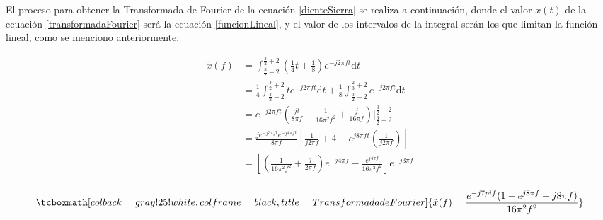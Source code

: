\documentclass[11pt,a4paper,twocolumn]{article}
\begin{document}
    El proceso para obtener la Transformada de Fourier de la ecuación \ref{dienteSierra} 
    se realiza a continuación, donde el valor $x(t)$ de la ecuación \ref{transformadaFourier} será la 
    ecuación \ref{funcionLineal}, y el valor de los intervalos de la integral serán los que 
    limitan la función lineal, como se menciono anteriormente: \cite{silviaRB}

    \begin{equation*}
        \begin{split}
            \tilde{x}(f)& = \int_{\frac{3}{2} -2}^{\frac{3}{2} +2}\left(\frac{1}{4} t+\frac{1}{8} \right) e^{-j2\pi ft}\mathrm{d}t \\
                        & = \frac{1}{4} \int_{\frac{3}{2}-2}^{\frac{3}{2}+2}t e^{-j2\pi ft}\mathrm{d}t + \frac{1}{8} \int_{\frac{3}{2} -2}^{\frac{2}{3} +2} e^{-j2\pi ft}\mathrm{d}t \\
                        & = e^{-j2\pi ft}\left(\frac{jt}{8\pi f}  + \frac{1}{16\pi ^{2} f^2}  + \frac{j}{16\pi f} \right)  \Big|_{\frac{3}{2} -2}^{\frac{3}{2} +2} \\
                        & = \frac{je^{-j3\pi ft } e^{-j4\pi ft}}{8\pi f} \left[\frac{1}{j2\pi f} + 4 
                          - e^{j8\pi ft} \left(\frac{1}{j2\pi f} \right)\right] \\
                        & = \left[\left(\frac{1}{16\pi^2 f^2}+\frac{j}{2\pi f}\right)e^{-j4\pi f}-\frac{e^{j4\pi f}}{16\pi^2 f^2}\right] e^{-j3\pi f} \\
        \end{split}
    \end{equation*}  
  

    \begin{equation}
        \tcboxmath[colback=gray!25!white,colframe=black, title=Transformada de Fourier]{
            \tilde{x}(f) = \frac{e^{-j7pi f }(1 - e^{j8\pi f} + j8\pi f)}{16\pi^2 f^2}
        }
    \end{equation}

\printbibliography[title={Bibliografía}]
\end{document}
